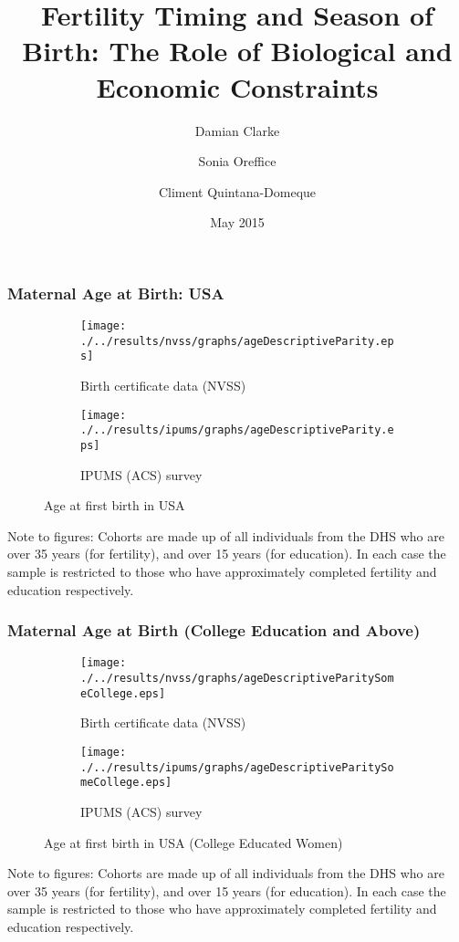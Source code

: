 \documentclass[10pt,letterpaper,subeqn]{beamer}
\title{Fertility Timing and Season of Birth: The Role of Biological and Economic 
Constraints}
\author{Damian Clarke\inst{\dag} 
   \and Sonia Oreffice\inst{\ddag} 
   \and Climent Quintana-Domeque\inst{*}}
\institute{\inst{\dag} U. of Oxford
      \and \inst{\ddag} U. of Surrey and IZA 
      \and \inst{*} U. of Oxford and IZA}
\date{May 2015}
\begin{document}
\begin{frame}
\titlepage
\end{frame}

\begin{frame}[label=sum]

\end{frame}

\begin{frame}[label=births]
\frametitle{Maternal Age at Birth: USA}
\begin{figure}[htpb!]
\begin{center}
\begin{subfigure}{.5\textwidth}
  \centering
  \texttt{[image: ./../results/nvss/graphs/ageDescriptiveParity.eps]}
  \caption{Birth certificate data (NVSS)}
  \label{fig:NVSSbirths}
\end{subfigure}%
\begin{subfigure}{.5\textwidth}
  \centering
  \texttt{[image: ./../results/ipums/graphs/ageDescriptiveParity.eps]}
  \caption{IPUMS (ACS) survey}
  \label{fig:IPUMSbirths}
\end{subfigure}
\caption{Age at first birth in USA}
\label{fig:births}
\end{center}
\end{figure}
\footnotesize{Note to figures: Cohorts are made up of all individuals 
from the DHS who are over 35 years (for fertility), and over 15 years (for education).  
In each case the sample is restricted to those who have approximately completed fertility 
and education respectively.}
\end{frame}


\begin{frame}[label=birthsCollege]
\frametitle{Maternal Age at Birth (College Education and Above)}
\begin{figure}[htpb!]
\begin{center}
\begin{subfigure}{.5\textwidth}
  \centering
  \texttt{[image: ./../results/nvss/graphs/ageDescriptiveParitySomeCollege.eps]}
  \caption{Birth certificate data (NVSS)}
  \label{fig:NVSSbirths}
\end{subfigure}%
\begin{subfigure}{.5\textwidth}
  \centering
  \texttt{[image: ./../results/ipums/graphs/ageDescriptiveParitySomeCollege.eps]}
  \caption{IPUMS (ACS) survey}
  \label{fig:IPUMSbirths}
\end{subfigure}
\caption{Age at first birth in USA (College Educated Women)}
\label{fig:births}
\end{center}
\end{figure}
\footnotesize{Note to figures: Cohorts are made up of all individuals 
from the DHS who are over 35 years (for fertility), and over 15 years (for education).  
In each case the sample is restricted to those who have approximately completed fertility 
and education respectively.}
\end{frame}
\end{document}
